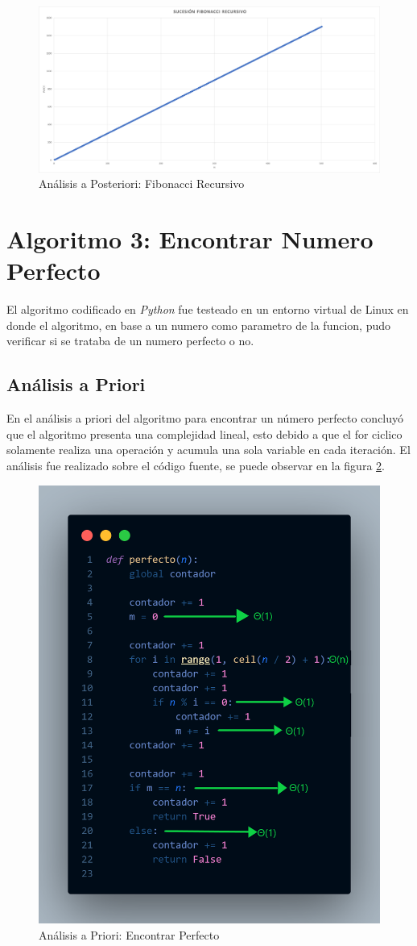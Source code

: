         
        \begin{figure}[htp!]
            \centering
            \includegraphics[width=1 \textwidth]{Images/posteriori_recursivo.png}  
            \caption{Análisis a Posteriori: Fibonacci Recursivo}
            \label{fig:recursivo_f}
        \end{figure}

\newpage
    \section{Algoritmo 3: Encontrar Numero Perfecto}
        El algoritmo codificado en \textit{Python} fue testeado en un entorno virtual de Linux en donde el algoritmo, en base a un numero como parametro de la funcion, pudo verificar si se trataba de un numero perfecto o no.
    
    \subsection{Análisis a Priori}
        En el análisis a priori del algoritmo para encontrar un número perfecto concluyó que el algoritmo presenta una complejidad lineal, esto debido a que el for ciclico solamente realiza una operación y acumula una sola variable en cada iteración. El análisis fue realizado sobre el código fuente, se puede observar en la figura \ref{fig:perfecto_priori}.
        \begin{figure}[htp!]
            \centering
            \includegraphics[width=0.6 \textwidth]{Images/priori_perfecto.png}
            \caption{Análisis a Priori: Encontrar Perfecto}
            \label{fig:perfecto_priori}
        \end{figure}
    
